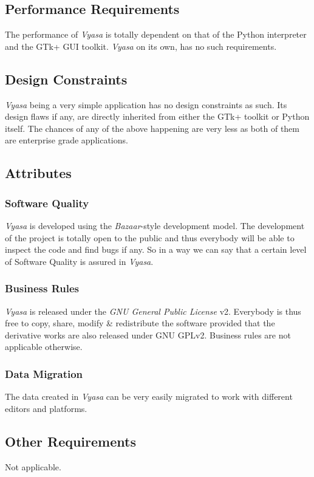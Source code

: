 \documentclass[12pt,a4paper]{article}
\newcommand{\VS}{\textit{Vyasa}}
\begin{document}
\subsection{Performance Requirements}
The performance of \VS{} is totally dependent on that of the  Python
interpreter and the GTk+ GUI toolkit. \VS{} on its own, has no such
requirements.

\subsection{Design Constraints}
\VS{} being a very simple application has no design constraints as
such. Its design flaws if any, are directly inherited from either the
GTk+ toolkit or Python itself. The chances of any of the above happening
are very less as both of them are enterprise grade applications.

\subsection{Attributes}

\subsubsection{Software Quality}
\VS{} is developed using the \textit{Bazaar}-style development
model. The development of the project is totally open to the public and
thus everybody will be able to inspect the code and find bugs if any. So
in a way we can say that a certain level of Software Quality is assured
in \VS{}.

\subsubsection{Business Rules}
\VS{} is released under the \textit{GNU General Public
  License} v2. Everybody is thus free to copy, share, modify \&{}
redistribute the software provided that the derivative works are also
released under GNU GPLv2. Business rules are not applicable otherwise.

\subsubsection{Data Migration}
The data created in \VS{} can be very easily migrated to work with
different editors and platforms.

\subsection{Other Requirements}
Not applicable.



\end{document}
